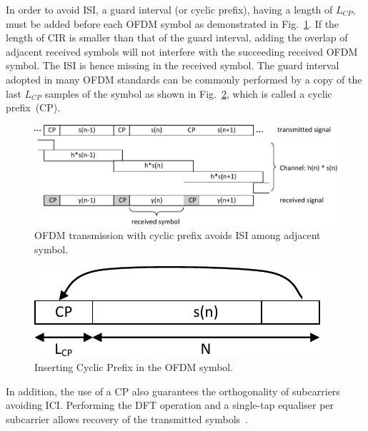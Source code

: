 In order to avoid ISI, a guard interval (or cyclic prefix), having a length of $L_{CP}$, must be added before each OFDM symbol as demonstrated in Fig.~\ref{fig:CIR-CP}.
If the length of CIR is smaller than that of the guard interval, adding the overlap of adjacent received symbols will not interfere with the succeeding received OFDM symbol.
The ISI is hence missing in the received symbol.
The guard interval adopted in many OFDM standards can be commonly performed by a copy of the last $L_{CP}$ samples of the symbol as shown in Fig.~\ref{fig:CP}, which is called a cyclic prefix~(CP).

\begin{figure}
	\centerline{\includegraphics [width=0.8\columnwidth] {Figures/CIR_CP.pdf} }
	\caption{OFDM transmission with cyclic prefix avoids ISI among adjacent symbol.}
	\label{fig:CIR-CP}
\end{figure}

\begin{figure}
	\centerline{\includegraphics [width=0.4\columnwidth] {Figures/CP.pdf} }
	\caption{Inserting Cyclic Prefix in the OFDM symbol.}
	\label{fig:CP}
\end{figure}

In addition, the use of a CP also guarantees the orthogonality of subcarriers avoiding ICI. Performing the DFT operation and a single-tap equaliser per subcarrier allows recovery of the transmitted symbols~\cite{farhang2008signal}.

